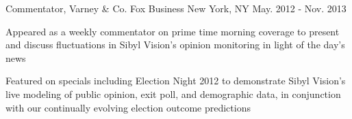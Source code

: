 \begin{cventries}

  \cventry
    {Commentator, Varney \& Co.} %
    {Fox Business} %
    {New York, NY} %
    {May. 2012 - Nov. 2013} %
    {
      \begin{cvitems} %
      	\item {Appeared as a weekly commentator on prime time morning coverage to present and discuss fluctuations in Sibyl Vision's opinion monitoring in light of the day's news}
      	\item {Featured on specials including Election Night 2012 to demonstrate Sibyl Vision's live modeling of public opinion, exit poll, and demographic data, in conjunction with our continually evolving election outcome predictions}
      \end{cvitems}
    }

    

\end{cventries}

